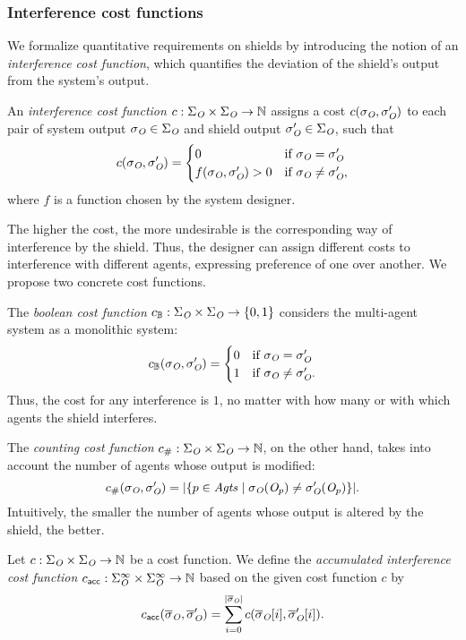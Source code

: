 \subsubsection{Interference cost functions}

We formalize quantitative requirements on shields by introducing the notion of an \emph{interference cost function}, which quantifies the deviation of the shield's output from the system's output.

\begin{defn}
An \emph{interference cost function} $c: \Sigma_{\textit{O}} \times \Sigma_{\textit{O}} \to \mathbb{N} $ assigns a cost $c(\sigma_{\textit{O}}, \sigma_{\textit{O}}')$
to each pair of system output $\sigma_{\textit{O}} \in \Sigma_{\textit{O}}$ and shield output $\sigma_{\textit{O}}' \in \Sigma_{\textit{O}}$,
such that
\[c(\sigma_{\textit{O}},\sigma_{\textit{O}}') = \begin{cases}
0 & \text{if } \sigma_{\textit{O}} = \sigma_{\textit{O}}'\\
f(\sigma_{\textit{O}},\sigma_{\textit{O}}') > 0 & \text{if } \sigma_{\textit{O}} \neq \sigma_{\textit{O}}',\\
\end{cases}\]
where $f$ is a function chosen by the system designer.
\end{defn}
The higher the cost, the more undesirable is the corresponding way of interference by the shield.
Thus, the designer can assign different costs to interference with different agents,
expressing preference of one over another.
We propose two concrete cost functions.

The \emph{boolean cost function} $c_{\mathbb{B}} : \Sigma_{\textit{O}} \times \Sigma_{\textit{O}} \to \{0,1\}$ considers the multi-agent system as a monolithic system:
\[c_{\mathbb{B}}(\sigma_{\textit{O}},\sigma_{\textit{O}}') = \begin{cases}
0 & \text{if } \sigma_{\textit{O}} = \sigma_{\textit{O}}'\\
1 & \text{if } \sigma_{\textit{O}} \neq \sigma_{\textit{O}}'.\\
\end{cases}\]
Thus, the cost  for any interference is $1$, no matter with how many or with which agents the shield interferes.

The \emph{counting cost function}  $c_{\#} : \Sigma_{\textit{O}} \times \Sigma_{\textit{O}} \to \mathbb{N}$, on the other hand, takes into account the number of agents whose output is modified:
\[c_{\#}(\sigma_{\textit{O}},\sigma_{\textit{O}}') = |\{p \in \mathit{Agts} \mid \sigma_{\textit{O}}(\textit{O}_p) \neq \sigma_{\textit{O}}'(\textit{O}_p)\}|.\]
Intuitively, the smaller the number of agents whose output is altered by the shield, the better.
%
\begin{defn}Let $c : \Sigma_{\textit{O}} \times \Sigma_{\textit{O}} \to \mathbb{N}$ be a cost function.
We define the \emph{accumulated interference cost function} $c_{\mathsf{acc}}: \Sigma_{\textit{O}}^\infty \times \Sigma_{\textit{O}}^\infty \to \mathbb{N}$ based on the given cost function $c$ by $$c_{\mathsf{acc}}(\overline\sigma_{\textit{O}},\overline\sigma_{\textit{O}}')=\sum_{i=0}^{|\overline\sigma_{\textit{O}}|}c(\overline\sigma_{\textit{O}}[i],\overline\sigma_{\textit{O}}'[i]).$$

\iffalse MEAN-PAYOFF
and the \emph{limit-average cost function}  $c_{\mathsf{mp}}(\trace): \oalphabet^\omega \times \oalphabet^\omega \to \nats$ 
$$c_{\mathsf{mp}}(\otrace,\otrace')=\lim\sup_{m\to\infty} \frac{1}{m+1} \cdot \sum_{i=0}^m c(\otrace[i],\otrace'[i]).$$
\fi
\end{defn}

